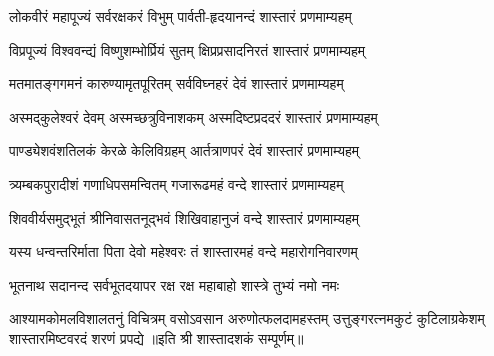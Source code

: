
\twolineshloka
{लोकवीरं महापूज्यं सर्वरक्षकरं विभुम्}
{पार्वती-हृदयानन्दं शास्तारं प्रणमाम्यहम्}

\twolineshloka
{विप्रपूज्यं विश्ववन्द्यं विष्णुशम्भोर्प्रियं सुतम्}
{क्षिप्रप्रसादनिरतं शास्तारं प्रणमाम्यहम्}

\twolineshloka
{मतमातङ्गगमनं कारुण्यामृतपूरितम्}
{सर्वविघ्नहरं देवं शास्तारं प्रणमाम्यहम्}

\twolineshloka
{अस्मद्कुलेश्वरं देवम् अस्मच्छत्रुविनाशकम्}
{अस्मदिष्टप्रददरं शास्तारं प्रणमाम्यहम्}

\twolineshloka
{पाण्ड्येशवंशतिलकं केरळे केलिविग्रहम्}
{आर्तत्राणपरं देवं शास्तारं प्रणमाम्यहम्}

\twolineshloka
{त्र्यम्बकपुरादीशं गणाधिपसमन्वितम्}
{गजारूढमहं वन्दे शास्तारं प्रणमाम्यहम्}

\twolineshloka
{शिववीर्यसमुद्भूतं श्रीनिवासतनूद्भवं}
{शिखिवाहानुजं वन्दे शास्तारं प्रणमाम्यहम्}

\twolineshloka
{यस्य धन्वन्तरिर्माता पिता देवो महेश्वरः}
{तं शास्तारमहं वन्दे महारोगनिवारणम्}

\twolineshloka
{भूतनाथ सदानन्द सर्वभूतदयापर}
{रक्ष रक्ष महाबाहो शास्त्रे तुभ्यं नमो नमः}

\fourlineindentedshloka
{आश्यामकोमलविशालतनुं विचित्रम्}
{वसोऽवसान अरुणोत्फलदामहस्तम्}
{उत्तुङ्गरत्नमकुटं कुटिलाग्रकेशम्}
{शास्तारमिष्टवरदं शरणं प्रपद्ये}
॥इति श्री शास्तादशकं सम्पूर्णम्॥